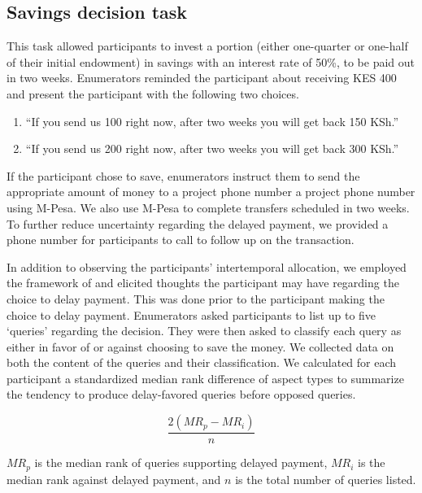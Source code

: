 \documentclass[11pt, a4paper]{article}\usepackage[]{graphicx}\usepackage[]{color}
\begin{document}
    \subsection{Savings decision task}

        This task allowed participants to invest a portion (either one-quarter or one-half of their initial endowment) in savings with an interest rate of 50\%, to be paid out in two weeks. Enumerators reminded the participant about receiving KES 400 and present the participant with the following two choices.

        \begin{enumerate}
        \itemsep0em 
            \item ``If you send us 100 right now, after two weeks you will get back 150 KSh.''
            \item ``If you send us 200 right now, after two weeks you will get back 300 KSh.''
        \end{enumerate}

        If the participant chose to save, enumerators instruct them to send the appropriate amount of money to a project phone number a project phone number using M-Pesa. We also use M-Pesa to complete transfers scheduled in two weeks. To further reduce uncertainty regarding the delayed payment, we provided a phone number for participants to call to follow up on the transaction.

        In addition to observing the participants' intertemporal allocation, we employed the framework of \textcite{johnson_aspects_2007} and elicited thoughts the participant may have regarding the choice to delay payment. This was done prior to the participant making the choice to delay payment. Enumerators asked participants to list up to five `queries' regarding the decision. They were then asked to classify each query as either in favor of or against choosing to save the money. We collected data on both the content of the queries and their classification. We calculated for each participant a standardized median rank difference of aspect types to summarize the tendency to produce delay-favored queries before opposed queries.

        \begin{equation}
            \frac{2 (MR_p - MR_i)}{n}
        \end{equation}

        $MR_p$ is the median rank of queries supporting delayed payment, $MR_i$ is the median rank against delayed payment, and $n$ is the total number of queries listed.
\end{document}
